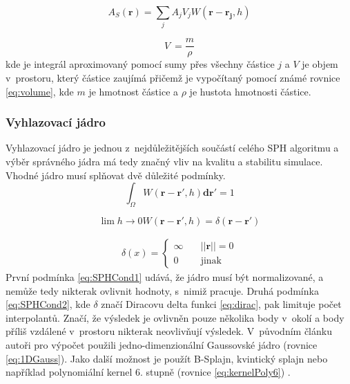 \begin{equation}
	A_S(\mathbf{r}) = \sum_j A_j V_j W(\mathbf{r} - \mathbf{r_j},h)
	\label{eq:SPHsum}
\end{equation}

\begin{equation}
	V~= \frac{m}{\rho}
	\label{eq:volume}
\end{equation}
kde je integrál aproximovaný pomocí sumy přes všechny částice $j$ a $V$ je objem v~prostoru, který částice zaujímá přičemž je vypočítaný pomocí známé rovnice \ref{eq:volume}, kde $m$ je hmotnost částice a $\rho$ je hustota hmotnosti částice.  \cite{KelagerSPH}

\subsubsection{Vyhlazovací jádro}
Vyhlazovací jádro je jednou z~nejdůležitějších součástí celého SPH algoritmu a výběr správného jádra má tedy značný vliv na kvalitu a stabilitu simulace. Vhodné jádro musí splňovat dvě důležité podmínky.
\begin{equation}
	\int_\Omega W(\mathbf{r} - \mathbf{r}', h)\mathbf{dr}' = 1
	\label{eq:SPHCond1}
\end{equation}

\begin{equation}
	\lim{h \to 0} W(\mathbf{r} - \mathbf{r}',h) = \delta(\mathbf{r} - \mathbf{r}')
	\label{eq:SPHCond2}
\end{equation}

\begin{equation} \label{eq:dirac}
	\begin{gathered}
		\delta(x) =
		\begin{cases}
			\infty & \quad ||\mathbf{r}|| = 0 \\
			0      & \quad \text{jinak}
		\end{cases}
	\end{gathered}
\end{equation}
První podmínka \ref{eq:SPHCond1} udává, že jádro musí být normalizované, a nemůže tedy nikterak ovlivnit hodnoty, s~nimiž pracuje. Druhá podmínka \ref{eq:SPHCond2}, kde $\delta$ značí Diracovu delta funkci \ref{eq:dirac}, pak limituje počet interpolantů. Značí, že výsledek je ovlivněn pouze několika body v~okolí a body příliš vzdálené v~prostoru nikterak neovlivňují výsledek. V~původním článku autoři pro výpočet použili jedno-dimenzionální Gaussovské jádro (rovnice \ref{eq:1DGauss}). Jako další možnost je použít B-Splajn, kvintický splajn \cite{Liu2010} nebo například polynomiální kernel 6. stupně (rovnice \ref{eq:kernelPoly6}) \cite{Muller03}.

